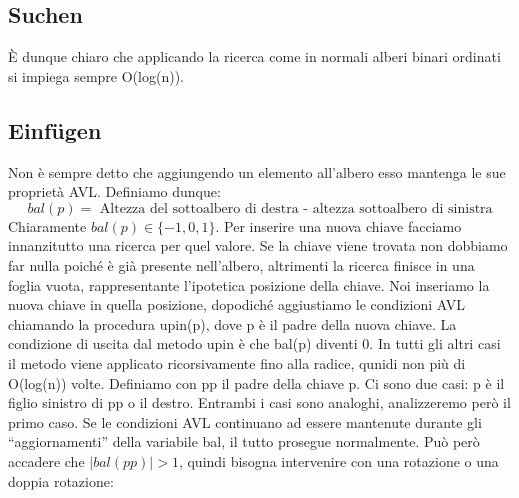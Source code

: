 \documentclass[a4paper]{book}
\begin{document}
\subsection*{Suchen}
È dunque chiaro che applicando la ricerca come in normali alberi binari ordinati si impiega sempre O(log(n)).
\subsection*{Einfügen}
Non è sempre detto che aggiungendo un elemento all'albero esso mantenga le sue proprietà AVL. Definiamo dunque:
$$ bal(p)=\mbox{ Altezza del sottoalbero di destra - altezza sottoalbero di sinistra}$$
Chiaramente $bal(p) \in \{-1,0,1\}$. Per inserire una nuova chiave facciamo innanzitutto una ricerca per quel valore. Se la chiave viene trovata non dobbiamo far nulla poiché è già presente nell'albero, altrimenti la ricerca finisce in una foglia vuota, rappresentante l'ipotetica posizione della chiave. Noi inseriamo la nuova chiave in quella posizione, dopodiché aggiustiamo le condizioni AVL chiamando la procedura upin(p), dove p è il padre della nuova chiave. La condizione di uscita dal metodo upin è che bal(p) diventi 0. In tutti gli altri casi il metodo viene applicato ricorsivamente fino alla radice, qunidi non più di O(log(n)) volte. Definiamo con pp il padre della chiave p. Ci sono due casi: p è il figlio sinistro di pp o il destro. Entrambi i casi sono analoghi, analizzeremo però il primo caso. Se le condizioni AVL continuano ad essere mantenute durante gli ``aggiornamenti'' della variabile bal, il tutto prosegue normalmente. Può però accadere che $|bal(pp)|>1$, quindi bisogna intervenire con una rotazione o una doppia rotazione:
\end{document}
